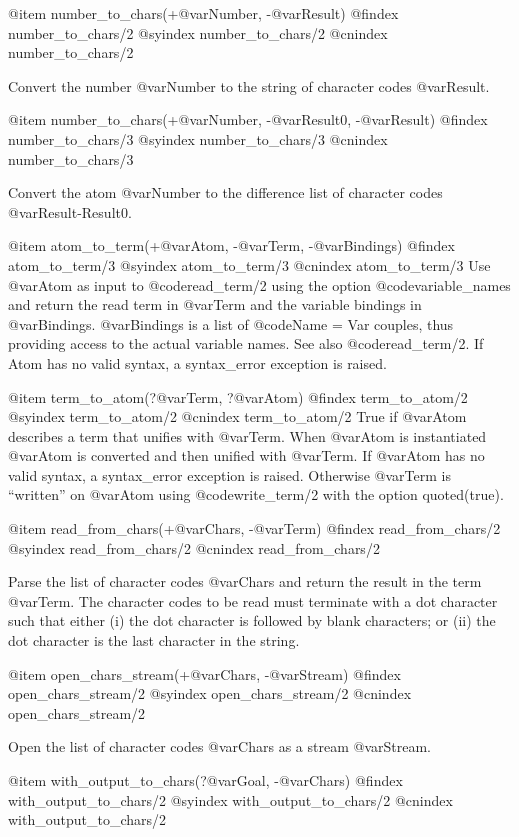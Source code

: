 @item number_to_chars(+@var{Number}, -@var{Result})
@findex number_to_chars/2
@syindex number_to_chars/2
@cnindex number_to_chars/2

Convert the number @var{Number} to the string of character codes
@var{Result}.

@item number_to_chars(+@var{Number}, -@var{Result0}, -@var{Result})
@findex number_to_chars/3
@syindex number_to_chars/3
@cnindex number_to_chars/3

Convert the atom @var{Number} to the difference list of character codes
@var{Result-Result0}.

@item atom_to_term(+@var{Atom}, -@var{Term}, -@var{Bindings})
@findex atom_to_term/3
@syindex atom_to_term/3
@cnindex atom_to_term/3
Use @var{Atom} as input to @code{read_term/2} using the option @code{variable_names} and return the read term in @var{Term} and the variable bindings in @var{Bindings}. @var{Bindings} is a list of @code{Name = Var} couples, thus providing access to the actual variable names. See also @code{read_term/2}. If Atom has no valid syntax, a syntax_error exception is raised.

@item term_to_atom(?@var{Term}, ?@var{Atom})
@findex term_to_atom/2
@syindex term_to_atom/2
@cnindex term_to_atom/2
True if @var{Atom} describes a term that unifies with @var{Term}. When
@var{Atom} is instantiated @var{Atom} is converted and then unified with
@var{Term}. If @var{Atom} has no valid syntax, a syntax_error exception
is raised. Otherwise @var{Term} is ``written'' on @var{Atom} using
@code{write_term/2} with the option quoted(true).

@item read_from_chars(+@var{Chars}, -@var{Term})
@findex read_from_chars/2
@syindex read_from_chars/2
@cnindex read_from_chars/2

Parse the list of character codes @var{Chars} and return the result in
the term @var{Term}. The character codes to be read must terminate with
a dot character such that either (i) the dot character is followed by
blank characters; or (ii) the dot character is the last character in the
string.

@item open_chars_stream(+@var{Chars}, -@var{Stream})
@findex open_chars_stream/2
@syindex open_chars_stream/2
@cnindex open_chars_stream/2

Open the list of character codes @var{Chars} as a stream @var{Stream}.

@item with_output_to_chars(?@var{Goal}, -@var{Chars})
@findex with_output_to_chars/2
@syindex with_output_to_chars/2
@cnindex with_output_to_chars/2

